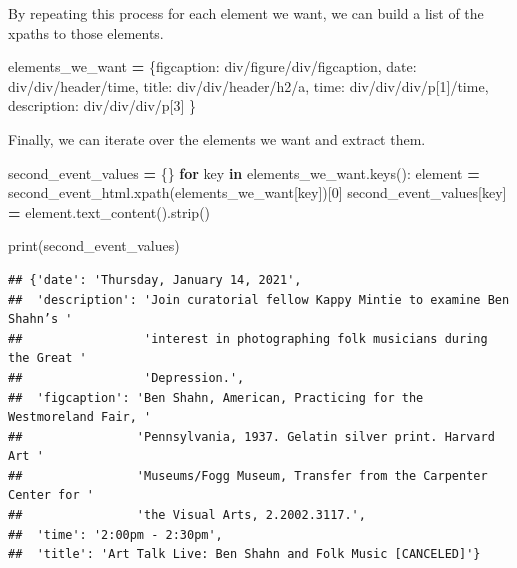 \documentclass[
]{book}
\newenvironment{Shaded}{\begin{snugshade}}{\end{snugshade}}
\newcommand{\BuiltInTok}[1]{#1}
\newcommand{\ControlFlowTok}[1]{\textcolor[rgb]{0.13,0.29,0.53}{\textbf{#1}}}
\newcommand{\DecValTok}[1]{\textcolor[rgb]{0.00,0.00,0.81}{#1}}
\newcommand{\KeywordTok}[1]{\textcolor[rgb]{0.13,0.29,0.53}{\textbf{#1}}}
\newcommand{\NormalTok}[1]{#1}
\newcommand{\OperatorTok}[1]{\textcolor[rgb]{0.81,0.36,0.00}{\textbf{#1}}}
\newcommand{\StringTok}[1]{\textcolor[rgb]{0.31,0.60,0.02}{#1}}
\begin{document}
By repeating this process for each element we want, we can build a list of the xpaths to those elements.

\begin{Shaded}
\begin{Highlighting}[]
\NormalTok{elements\_we\_want }\OperatorTok{=}\NormalTok{ \{}\StringTok{\textquotesingle{}figcaption\textquotesingle{}}\NormalTok{: }\StringTok{\textquotesingle{}div/figure/div/figcaption\textquotesingle{}}\NormalTok{,}
                    \StringTok{\textquotesingle{}date\textquotesingle{}}\NormalTok{: }\StringTok{\textquotesingle{}div/div/header/time\textquotesingle{}}\NormalTok{,}
                    \StringTok{\textquotesingle{}title\textquotesingle{}}\NormalTok{: }\StringTok{\textquotesingle{}div/div/header/h2/a\textquotesingle{}}\NormalTok{,}
                    \StringTok{\textquotesingle{}time\textquotesingle{}}\NormalTok{: }\StringTok{\textquotesingle{}div/div/div/p[1]/time\textquotesingle{}}\NormalTok{,}
                    \StringTok{\textquotesingle{}description\textquotesingle{}}\NormalTok{: }\StringTok{\textquotesingle{}div/div/div/p[3]\textquotesingle{}}
\NormalTok{                    \}}
\end{Highlighting}
\end{Shaded}

Finally, we can iterate over the elements we want and extract them.

\begin{Shaded}
\begin{Highlighting}[]
\NormalTok{second\_event\_values }\OperatorTok{=}\NormalTok{ \{\}}
\ControlFlowTok{for}\NormalTok{ key }\KeywordTok{in}\NormalTok{ elements\_we\_want.keys():}
\NormalTok{    element }\OperatorTok{=}\NormalTok{ second\_event\_html.xpath(elements\_we\_want[key])[}\DecValTok{0}\NormalTok{]}
\NormalTok{    second\_event\_values[key] }\OperatorTok{=}\NormalTok{ element.text\_content().strip()}

\BuiltInTok{print}\NormalTok{(second\_event\_values)}
\end{Highlighting}
\end{Shaded}

\begin{verbatim}
## {'date': 'Thursday, January 14, 2021',
##  'description': 'Join curatorial fellow Kappy Mintie to examine Ben Shahn’s '
##                 'interest in photographing folk musicians during the Great '
##                 'Depression.',
##  'figcaption': 'Ben Shahn, American, Practicing for the Westmoreland Fair, '
##                'Pennsylvania, 1937. Gelatin silver print. Harvard Art '
##                'Museums/Fogg Museum, Transfer from the Carpenter Center for '
##                'the Visual Arts, 2.2002.3117.',
##  'time': '2:00pm - 2:30pm',
##  'title': 'Art Talk Live: Ben Shahn and Folk Music [CANCELED]'}
\end{verbatim}
\end{document}
